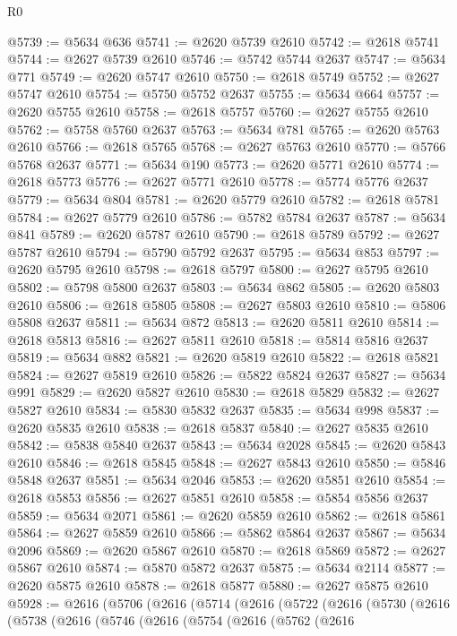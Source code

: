\begin{lexlean}{R0}
\begin{coremodule}
@5739 := @5634 @636
@5741 := @2620 @5739 @2610
@5742 := @2618 @5741
@5744 := @2627 @5739 @2610
@5746 := @5742 @5744 @2637
@5747 := @5634 @771
@5749 := @2620 @5747 @2610
@5750 := @2618 @5749
@5752 := @2627 @5747 @2610
@5754 := @5750 @5752 @2637
@5755 := @5634 @664
@5757 := @2620 @5755 @2610
@5758 := @2618 @5757
@5760 := @2627 @5755 @2610
@5762 := @5758 @5760 @2637
@5763 := @5634 @781
@5765 := @2620 @5763 @2610
@5766 := @2618 @5765
@5768 := @2627 @5763 @2610
@5770 := @5766 @5768 @2637
@5771 := @5634 @190
@5773 := @2620 @5771 @2610
@5774 := @2618 @5773
@5776 := @2627 @5771 @2610
@5778 := @5774 @5776 @2637
@5779 := @5634 @804
@5781 := @2620 @5779 @2610
@5782 := @2618 @5781
@5784 := @2627 @5779 @2610
@5786 := @5782 @5784 @2637
@5787 := @5634 @841
@5789 := @2620 @5787 @2610
@5790 := @2618 @5789
@5792 := @2627 @5787 @2610
@5794 := @5790 @5792 @2637
@5795 := @5634 @853
@5797 := @2620 @5795 @2610
@5798 := @2618 @5797
@5800 := @2627 @5795 @2610
@5802 := @5798 @5800 @2637
@5803 := @5634 @862
@5805 := @2620 @5803 @2610
@5806 := @2618 @5805
@5808 := @2627 @5803 @2610
@5810 := @5806 @5808 @2637
@5811 := @5634 @872
@5813 := @2620 @5811 @2610
@5814 := @2618 @5813
@5816 := @2627 @5811 @2610
@5818 := @5814 @5816 @2637
@5819 := @5634 @882
@5821 := @2620 @5819 @2610
@5822 := @2618 @5821
@5824 := @2627 @5819 @2610
@5826 := @5822 @5824 @2637
@5827 := @5634 @991
@5829 := @2620 @5827 @2610
@5830 := @2618 @5829
@5832 := @2627 @5827 @2610
@5834 := @5830 @5832 @2637
@5835 := @5634 @998
@5837 := @2620 @5835 @2610
@5838 := @2618 @5837
@5840 := @2627 @5835 @2610
@5842 := @5838 @5840 @2637
@5843 := @5634 @2028
@5845 := @2620 @5843 @2610
@5846 := @2618 @5845
@5848 := @2627 @5843 @2610
@5850 := @5846 @5848 @2637
@5851 := @5634 @2046
@5853 := @2620 @5851 @2610
@5854 := @2618 @5853
@5856 := @2627 @5851 @2610
@5858 := @5854 @5856 @2637
@5859 := @5634 @2071
@5861 := @2620 @5859 @2610
@5862 := @2618 @5861
@5864 := @2627 @5859 @2610
@5866 := @5862 @5864 @2637
@5867 := @5634 @2096
@5869 := @2620 @5867 @2610
@5870 := @2618 @5869
@5872 := @2627 @5867 @2610
@5874 := @5870 @5872 @2637
@5875 := @5634 @2114
@5877 := @2620 @5875 @2610
@5878 := @2618 @5877
@5880 := @2627 @5875 @2610
@5928 := @2616
    (@5706
      (@2616
        (@5714
          (@2616
            (@5722
              (@2616
                (@5730
                  (@2616
                    (@5738
                      (@2616
                        (@5746
                          (@2616
                            (@5754
                              (@2616
                                (@5762
                                  (@2616

\end{coremodule}
\end{lexlean}

